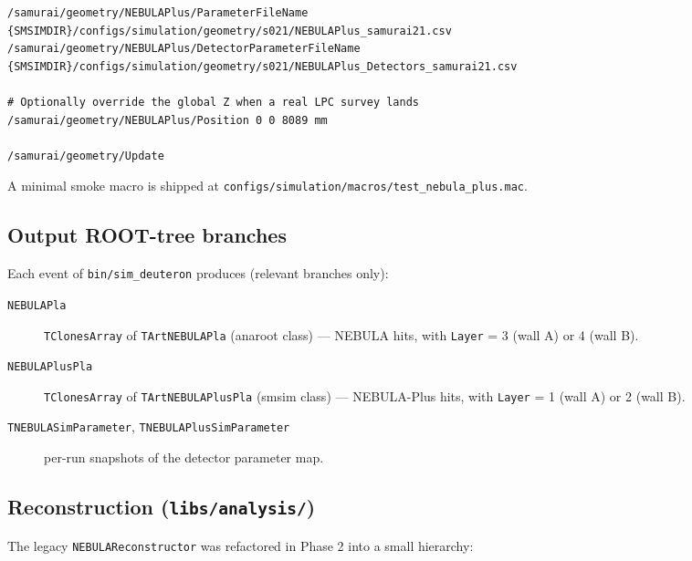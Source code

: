 \documentclass[11pt,a4paper]{article}
\newcommand{\NEB}{NEBULA}
\newcommand{\NPL}{NEBULA-Plus}
\begin{document}
\begin{CJK}{UTF8}{gbsn}
\begin{lstlisting}
/samurai/geometry/NEBULAPlus/ParameterFileName       {SMSIMDIR}/configs/simulation/geometry/s021/NEBULAPlus_samurai21.csv
/samurai/geometry/NEBULAPlus/DetectorParameterFileName  {SMSIMDIR}/configs/simulation/geometry/s021/NEBULAPlus_Detectors_samurai21.csv

# Optionally override the global Z when a real LPC survey lands
/samurai/geometry/NEBULAPlus/Position 0 0 8089 mm

/samurai/geometry/Update
\end{lstlisting}

A minimal smoke macro is shipped at
\texttt{configs/simulation/macros/test\_nebula\_plus.mac}.

\subsection{Output ROOT-tree branches}

Each event of \texttt{bin/sim\_deuteron} produces (relevant branches only):

\begin{description}
  \item[\texttt{NEBULAPla}]     \texttt{TClonesArray} of
        \texttt{TArtNEBULAPla} (anaroot class) --- \NEB{} hits, with
        \texttt{Layer} = 3 (wall A) or 4 (wall B).
  \item[\texttt{NEBULAPlusPla}] \texttt{TClonesArray} of
        \texttt{TArtNEBULAPlusPla} (smsim class) --- \NPL{} hits, with
        \texttt{Layer} = 1 (wall A) or 2 (wall B).
  \item[\texttt{TNEBULASimParameter}, \texttt{TNEBULAPlusSimParameter}]
        per-run snapshots of the detector parameter map.
\end{description}

\subsection{Reconstruction (\texttt{libs/analysis/})}

The legacy \texttt{NEBULAReconstructor} was refactored in Phase 2 into a
small hierarchy:


\end{CJK}
\end{document}
